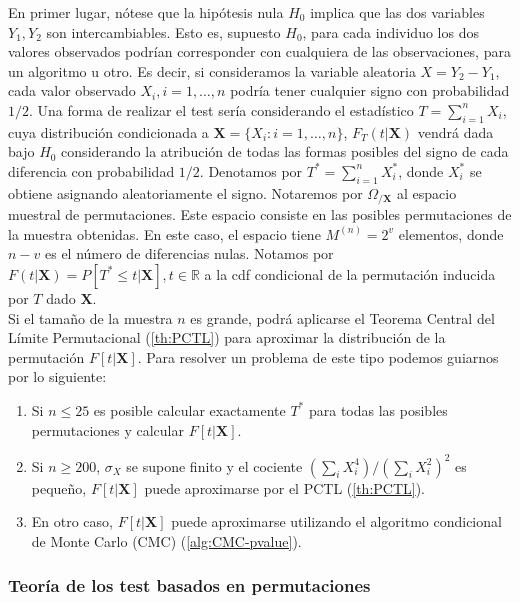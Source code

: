 	En primer lugar, nótese que la hipótesis nula $H_0$ 
implica que las dos variables $Y_1, Y_2$ son intercambiables. 
Esto es, supuesto $H_0$, para cada individuo los dos valores 
observados podrían corresponder con cualquiera de las 
observaciones, para un algoritmo u otro. Es decir, si 
consideramos la variable aleatoria $X = Y_2 - Y_1$, cada 
valor observado $X_i, i=1, \dots, n$ podría tener cualquier 
signo con probabilidad $1/2$. Una forma de realizar el test 
sería considerando el estadístico $T = \sum\limits_{i=1}^n 
X_i$, cuya distribución condicionada a $\mathbf{X} = \{X_i: i 
= 1, \dots, n\}$, $F_T(t|\mathbf{X})$ vendrá dada bajo $H_0$ 
considerando la atribución de todas las formas posibles del 
signo de cada diferencia con probabilidad $1/2$. Denotamos
por $T^* = \sum\limits_{i=1}^n X_i^*$, donde 
$X_i^*$ se obtiene asignando aleatoriamente el signo. 
Notaremos por $\Omega_{/\mathbf{X}}$ al espacio muestral de 
permutaciones. Este espacio consiste en las posibles 
permutaciones de la muestra obtenidas. En este caso, el espacio 
tiene $M^{(n)} = 2^v$ elementos, donde $n-v$ es el número de 
diferencias nulas. Notamos por $F(t|\mathbf{X}) = P[T^* \leq 
t | \mathbf{X}], t \in \mathbb{R}$ a la cdf condicional de la 
permutación inducida por $T$ dado $\mathbf{X}$.\\
	Si el tamaño de la muestra $n$ es grande, podrá aplicarse 
el Teorema Central del Límite Permutacional (\ref{th:PCTL}) 
para aproximar la distribución de la permutación 
$F[t|\mathbf{X}]$. Para resolver un problema de este tipo 
podemos guiarnos por lo siguiente:
	
\begin{enumerate}[a]
	\item Si $n \leq 25$ es posible calcular exactamente 
		$T^*$  para todas las posibles permutaciones y 
		calcular $F[t|\mathbf{X}]$.
	\item Si $n \geq 200$, $\sigma_X$ se supone finito y el 
		cociente $(\sum_i X_i^4)/(\sum_i X_i^2)^2$ es 
		pequeño, $F[t|\mathbf{X}]$ puede aproximarse por 
		el PCTL (\ref{th:PCTL}). 
	\item En otro caso, $F[t|\mathbf{X}]$ puede aproximarse 
		utilizando el algoritmo condicional de Monte 
		Carlo (CMC) (\ref{alg:CMC-pvalue}).
\end{enumerate}
	
\subsubsection{Teoría de los test basados en permutaciones}

